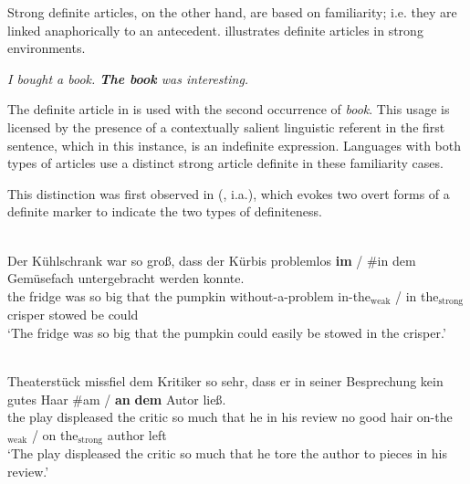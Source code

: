\documentclass[output=paper,
modfonts
]{langscibook}
\begin{document}
Strong definite articles, on the other hand, are based on familiarity; i.e. they are linked anaphorically to an antecedent.  illustrates definite articles in strong environments. 

\begin{exe}
\ex \label{ex:irani:13} \textit{I bought a book. \textbf{The book} was interesting.}
\end{exe}

The definite article in  is used with the second occurrence of \textit{book}. This usage is licensed by the presence of a contextually salient linguistic referent in the first sentence, which in this instance, is an indefinite expression. Languages with both types of articles use a distinct strong article definite in these familiarity cases. 

This distinction was first observed in  (\citealt{Heinrichs1954,Hartmann1982,Schwarz2009}, i.a.), which evokes two overt forms of a definite marker to indicate the two types of definiteness.

\begin{exe} 
\ex \label{ex:irani:14}  \\
\gll Der {K{\"u}hlschrank} {war} {so} {gro{\ss}}, {dass} {der} {K{\"u}rbis} {problemlos}
{\textbf{im}} \textnormal{/} \textnormal{\#}{in} {dem} {Gem{\"u}sefach} {untergebracht} {werden} {konnte}.\\
the fridge was so big that the pumpkin without-a-problem in-the$_\text{weak}$ / \phantom{\#}in the$_\text{strong}$ crisper stowed be could\\
\trans `The fridge was so big that the pumpkin could easily be stowed in the crisper.’ \citep[52]{Schwarz2009} 


\ex \label{ex:irani:15}  \\  {Theaterst{\"u}ck} {missfiel} {dem} {Kritiker} {so} {sehr}, {dass} {er} {in} {seiner} {Besprechung} {kein} {gutes} {Haar} \textnormal{\#}{am} \textnormal{/} {\textbf{an}} {\textbf{dem}} {Autor} {ließ}.\\
the play displeased the critic so much that he in his review no good hair \phantom{\#}on-the$_\text{weak}$ / on the$_\text{strong}$ author left\\
\trans `The play displeased the critic so much that he tore the author to pieces in his review.’ \citep[53]{Schwarz2009}

\end{exe} 
\end{document}
